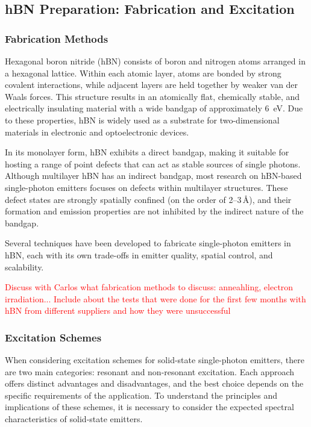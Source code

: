 \subsection{\label{sec:source_prep}hBN Preparation: Fabrication and Excitation}

\subsubsection{Fabrication Methods}

Hexagonal boron nitride (hBN) consists of boron and nitrogen atoms arranged in a hexagonal lattice. Within each atomic layer, atoms are bonded by strong covalent interactions, while adjacent layers are held together by weaker van der Waals forces. This structure results in an atomically flat, chemically stable, and electrically insulating material with a wide bandgap of approximately 6~eV. Due to these properties, hBN is widely used as a substrate for two-dimensional materials in electronic and optoelectronic devices.

In its monolayer form, hBN exhibits a direct bandgap, making it suitable for hosting a range of point defects that can act as stable sources of single photons. Although multilayer hBN has an indirect bandgap, most research on hBN-based single-photon emitters focuses on defects within multilayer structures. These defect states are strongly spatially confined (on the order of 2--3\,\AA), and their formation and emission properties are not inhibited by the indirect nature of the bandgap.

Several techniques have been developed to fabricate single-photon emitters in hBN, each with its own trade-offs in emitter quality, spatial control, and scalability. 

\textcolor{red}{Discuss with Carlos what fabrication methods to discuss: anneahling, electron irradiation... Include about the tests that were done for the first few months with hBN from different suppliers and how they were unsuccessful}





\subsubsection{Excitation Schemes}

When considering excitation schemes for solid-state single-photon emitters, there are two main categories: resonant and non-resonant excitation. Each approach offers distinct advantages and disadvantages, and the best choice depends on the specific requirements of the application. To understand the principles and implications of these schemes, it is necessary to consider the expected spectral characteristics of solid-state emitters.

